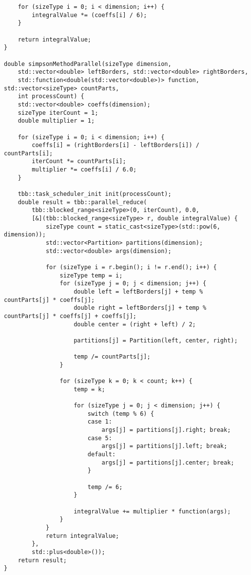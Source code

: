 \documentclass{report}
\begin{document}
\begin{lstlisting}
    for (sizeType i = 0; i < dimension; i++) {
        integralValue *= (coeffs[i] / 6);
    }

    return integralValue;
}

double simpsonMethodParallel(sizeType dimension,
    std::vector<double> leftBorders, std::vector<double> rightBorders,
    std::function<double(std::vector<double>)> function, std::vector<sizeType> countParts,
    int processCount) {
    std::vector<double> coeffs(dimension);
    sizeType iterCount = 1;
    double multiplier = 1;

    for (sizeType i = 0; i < dimension; i++) {
        coeffs[i] = (rightBorders[i] - leftBorders[i]) / countParts[i];
        iterCount *= countParts[i];
        multiplier *= coeffs[i] / 6.0;
    }

    tbb::task_scheduler_init init(processCount);
    double result = tbb::parallel_reduce(
        tbb::blocked_range<sizeType>(0, iterCount), 0.0,
        [&](tbb::blocked_range<sizeType> r, double integralValue) {
            sizeType count = static_cast<sizeType>(std::pow(6, dimension));
            std::vector<Partition> partitions(dimension);
            std::vector<double> args(dimension);

            for (sizeType i = r.begin(); i != r.end(); i++) {
                sizeType temp = i;
                for (sizeType j = 0; j < dimension; j++) {
                    double left = leftBorders[j] + temp % countParts[j] * coeffs[j];
                    double right = leftBorders[j] + temp % countParts[j] * coeffs[j] + coeffs[j];
                    double center = (right + left) / 2;

                    partitions[j] = Partition(left, center, right);

                    temp /= countParts[j];
                }

                for (sizeType k = 0; k < count; k++) {
                    temp = k;

                    for (sizeType j = 0; j < dimension; j++) {
                        switch (temp % 6) {
                        case 1:
                            args[j] = partitions[j].right; break;
                        case 5:
                            args[j] = partitions[j].left; break;
                        default:
                            args[j] = partitions[j].center; break;
                        }

                        temp /= 6;
                    }

                    integralValue += multiplier * function(args);
                }
            }
            return integralValue;
        },
        std::plus<double>());
    return result;
}

\end{lstlisting}
\end{document}
